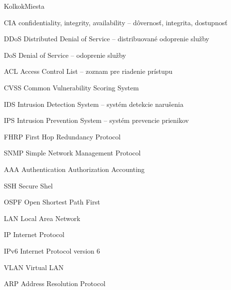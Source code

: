 \begin{seznamzkratek}{KolkokMiesta}

	{CIA} %
	{confidentiality, integrity, availability -- dôvernosť, integrita, dostupnosť} %

	{DDoS} %
	{Distributed Denial of Service -- distribuované odoprenie služby} %
	
	{DoS} %
	{Denial of Service -- odoprenie služby} %

	{ACL} %
	{Access Control List -- zoznam pre riadenie prístupu} %

	{CVSS} %
	{Common Vulnerability Scoring System} %
		
	{IDS} %
	{Intrusion Detection System -- systém detekcie narušenia} %

	{IPS} %
	{Intrusion Prevention System -- systém prevencie prienikov} %

	{FHRP} %
	{First Hop Redundancy Protocol} %

	{SNMP} %
	{Simple Network Management Protocol} %
	
	{AAA} %
	{Authentication Authorization Accounting} %
	
	{SSH} %
	{Secure Shel} %
	
	{OSPF} %
	{Open Shortest Path First} %

	{LAN} %
	{Local Area Network} %

	{IP} %
	{Internet Protocol} %
	
	{IPv6} %
	{Internet Protocol version 6} %
	
	{VLAN} %
	{Virtual LAN} %
	
	{ARP} %
	{Address Resolution Protocol} %


\end{seznamzkratek}
